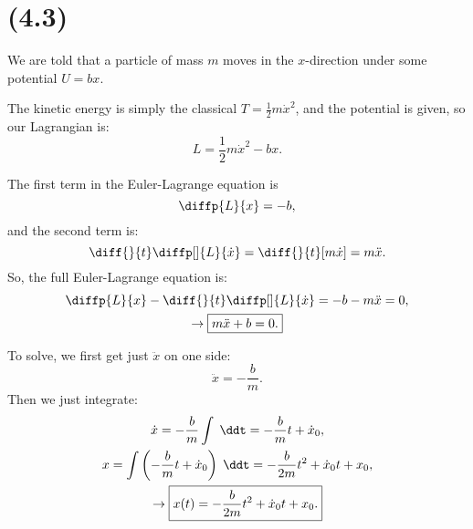 \section{(4.3)}

We are told that a particle of mass $m$ moves in the $x$-direction under some potential $U = bx$.

\begin{parts}
\item The kinetic energy is simply the classical $T = \frac{1}{2}m\dot{x}^2$, and the potential is given, so our Lagrangian is:
\begin{equation}
    L = \frac{1}{2}m\dot{x}^2 - bx.
\end{equation}

\item The first term in the Euler-Lagrange equation is
\begin{equation*}
    \diffp{L}{x} = -b,
\end{equation*}
and the second term is:
\begin{equation*}
    \diff{}{t}\diffp[]{L}{\dot{x}} = \diff{}{t}[m\dot{x}] = m\ddot{x}.
\end{equation*}
So, the full Euler-Lagrange equation is:
\begin{gather*}
    \diffp{L}{x} - \diff{}{t}\diffp[]{L}{\dot{x}} = -b - m\ddot{x} = 0, \\
    \rightarrow \boxed{m\ddot{x} + b = 0.}
\end{gather*}


\item To solve, we first get just $\ddot{x}$ on one side:
\begin{equation*}
    \ddot{x} = -\frac{b}{m}.
\end{equation*}
Then we just integrate:
\begin{gather*}
    \dot{x} = -\frac{b}{m}\int \;\ddt = -\frac{b}{m}t + \dot{x}_0, \\
    x = \int \left(-\frac{b}{m}t + \dot{x}_0\right) \;\ddt = -\frac{b}{2m}t^2 + \dot{x}_0 t + x_0, \\
    \rightarrow \boxed{x(t) = -\frac{b}{2m}t^2 + \dot{x}_0 t + x_0.}
\end{gather*}



\end{parts}